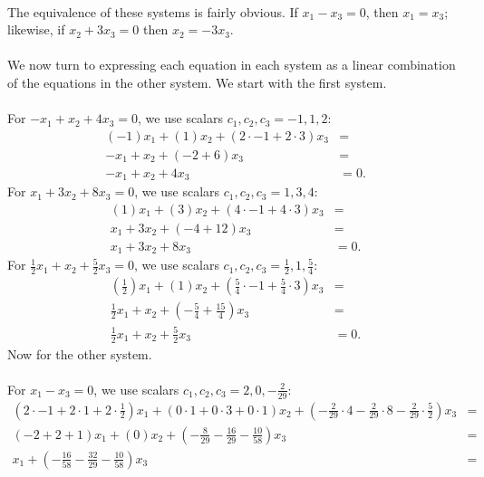\documentclass[12pt]{article}
\begin{document}
\begin{enumerate}
\[\begin{array}{rcrcrcl}
      \end{array}
      \]
      The equivalence of these systems is fairly obvious. If $x_1 - x_3
      = 0$, then $x_1 = x_3$; likewise, if $x_2 + 3x_3 = 0$ then
      $x_2 = -3x_3$.\\\\
      We now turn to expressing each equation in each system as a
      linear combination of the equations in the other
      system. We start with the first system.\\\\
      For $-x_1 + x_2 + 4x_3 = 0$, we use scalars $c_1, c_2, c_3
      = -1, 1, 2$:
      \begin{align*}
        (-1)x_1 + (1)x_2 + (2\cdot-1 + 2\cdot3)x_3 &=\\
        -x_1 + x_2 + (-2 + 6)x_3 &=\\
        -x_1 + x_2 + 4x_3 &= 0.
      \end{align*}
      For $x_1 + 3x_2 + 8x_3 = 0$, we use scalars $c_1, c_2, c_3
      = 1, 3, 4$:
      \begin{align*}
        (1)x_1 + (3)x_2 + (4\cdot-1 + 4\cdot3)x_3 &=\\
        x_1 + 3x_2 + (-4 + 12)x_3 &=\\
        x_1 + 3x_2 + 8x_3 &= 0.
      \end{align*}
      For $\frac{1}{2}x_1 + x_2 + \frac{5}{2}x_3 = 0$, we use scalars $c_1, c_2, c_3
      = \frac{1}{2}, 1, \frac{5}{4}$:
      \begin{align*}
        (\frac{1}{2})x_1 + (1)x_2 + (\frac{5}{4}\cdot-1 + \frac{5}{4}\cdot3)x_3 &=\\
        \frac{1}{2}x_1 + x_2 + (-\frac{5}{4} + \frac{15}{4})x_3 &=\\
        \frac{1}{2}x_1 + x_2 + \frac{5}{2}x_3 &= 0.
      \end{align*}
      Now for the other system.\\\\
      For $x_1 - x_3 = 0$, we use scalars $c_1, c_2, c_3
      = 2, 0, -\frac{2}{29}$:
      \begin{align*}
        (2\cdot-1 + 2\cdot1 + 2\cdot\frac{1}{2})x_1 +
        (0\cdot1 + 0\cdot3 + 0\cdot1)x_2 +
        (-\frac{2}{29}\cdot4 - \frac{2}{29}\cdot8 - \frac{2}{29}\cdot\frac{5}{2})x_3 &=\\
        (-2 + 2 + 1)x_1 + (0)x_2 + (-\frac{8}{29} - \frac{16}{29}
        - \frac{10}{58})x_3 &=\\
        x_1 + (-\frac{16}{58} - \frac{32}{29} - \frac{10}{58})x_3 &=\\

\end{align*}
\end{enumerate}
\end{document}
